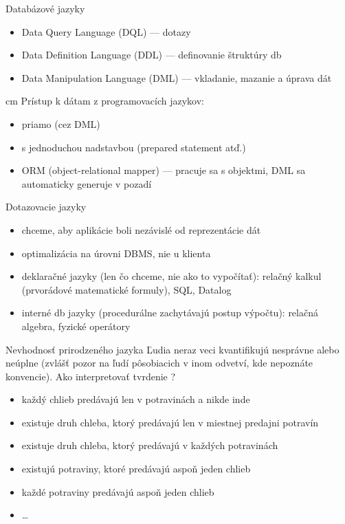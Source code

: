 \documentclass[12pt]{beamer}
\begin{document}
\begin{frame}{Databázové jazyky}
\begin{itemize}
\item Data Query Language (DQL) --- dotazy
\item Data Definition Language (DDL) --- definovanie štruktúry db
\item Data Manipulation Language (DML) --- vkladanie, mazanie a úprava dát
\end{itemize}
 cm
\pause
Prístup k dátam z programovacích jazykov:
\begin{itemize}
\item priamo (cez DML)
\item s jednoduchou nadstavbou (prepared statement atď.)
\item ORM (object-relational mapper) --- pracuje sa s objektmi, DML sa automaticky generuje v pozadí 
\end{itemize}
\end{frame}

\begin{frame}{Dotazovacie jazyky}
\begin{itemize}
\item chceme, aby aplikácie boli nezávislé od reprezentácie dát
\item optimalizácia na úrovni DBMS, nie u klienta
\pause
\item deklaračné jazyky (len čo chceme, nie ako to vypočítať): relačný kalkul (prvorádové matematické formuly), SQL, Datalog
\pause
\item interné db jazyky (procedurálne zachytávajú postup výpočtu): relačná algebra, fyzické operátory
\end{itemize}
\end{frame}

\begin{frame}{Nevhodnosť prirodzeného jazyka}
Ľudia neraz veci kvantifikujú nesprávne alebo neúplne (zvlášť pozor na ľudí pôsobiacich v inom odvetví, kde nepoznáte konvencie).
Ako interpretovať tvrdenie ?
\pause
\begin{itemize}
\item každý chlieb predávajú len v potravinách a nikde inde
\item existuje druh chleba, ktorý predávajú len v miestnej predajni potravín
\item existuje druh chleba, ktorý predávajú v každých potravinách
\item existujú potraviny, ktoré predávajú aspoň jeden chlieb
\item každé potraviny predávajú aspoň jeden chlieb
\item \dots
\end{itemize}
\end{frame}
\end{document}
